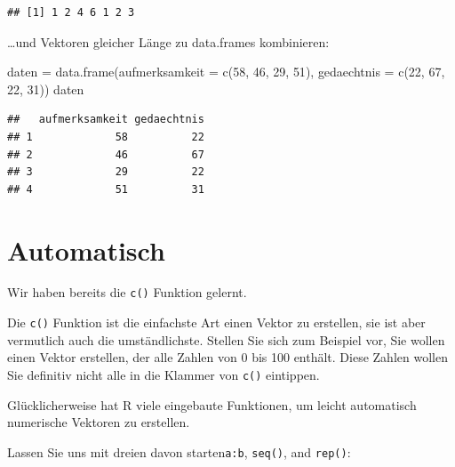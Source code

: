 \documentclass[
]{book}
\newenvironment{Shaded}{\begin{snugshade}}{\end{snugshade}}
\newcommand{\AttributeTok}[1]{\textcolor[rgb]{0.77,0.63,0.00}{#1}}
\newcommand{\DecValTok}[1]{\textcolor[rgb]{0.00,0.00,0.81}{#1}}
\newcommand{\FunctionTok}[1]{\textcolor[rgb]{0.00,0.00,0.00}{#1}}
\newcommand{\NormalTok}[1]{#1}
\newcommand{\OtherTok}[1]{\textcolor[rgb]{0.56,0.35,0.01}{#1}}
\begin{document}
\begin{verbatim}
## [1] 1 2 4 6 1 2 3
\end{verbatim}

\ldots und Vektoren gleicher Länge zu data.frames kombinieren:

\begin{Shaded}
\begin{Highlighting}[]
\NormalTok{daten }\OtherTok{=} \FunctionTok{data.frame}\NormalTok{(}\AttributeTok{aufmerksamkeit =} \FunctionTok{c}\NormalTok{(}\DecValTok{58}\NormalTok{, }\DecValTok{46}\NormalTok{, }\DecValTok{29}\NormalTok{, }\DecValTok{51}\NormalTok{),}
                   \AttributeTok{gedaechtnis =} \FunctionTok{c}\NormalTok{(}\DecValTok{22}\NormalTok{, }\DecValTok{67}\NormalTok{, }\DecValTok{22}\NormalTok{, }\DecValTok{31}\NormalTok{))}
\NormalTok{daten}
\end{Highlighting}
\end{Shaded}

\begin{verbatim}
##   aufmerksamkeit gedaechtnis
## 1             58          22
## 2             46          67
## 3             29          22
## 4             51          31
\end{verbatim}

\hypertarget{automatisch}{%
\section{Automatisch}\label{automatisch}}

Wir haben bereits die \texttt{c()} Funktion gelernt.

Die \texttt{c()} Funktion ist die einfachste Art einen Vektor zu erstellen, sie ist aber vermutlich auch die umständlichste. Stellen Sie sich zum Beispiel vor, Sie wollen einen Vektor erstellen, der alle Zahlen von 0 bis 100 enthält. Diese Zahlen wollen Sie definitiv nicht alle in die Klammer von \texttt{c()} eintippen.

Glücklicherweise hat R viele eingebaute Funktionen, um leicht automatisch numerische Vektoren zu erstellen.

Lassen Sie uns mit dreien davon starten\texttt{a:b}, \texttt{seq()}, and \texttt{rep()}:
\end{document}
